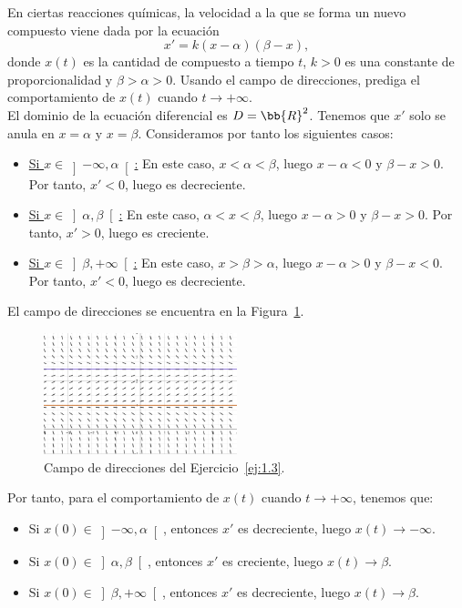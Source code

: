\begin{ejercicio} \label{ej:1.3}
    En ciertas reacciones químicas, la velocidad a la que se forma un nuevo compuesto viene dada por la ecuación
    \begin{equation*}
        x' = k(x - \alpha)(\beta - x),
    \end{equation*}
    donde \(x(t)\) es la cantidad de compuesto a tiempo \(t\), \(k > 0\) es una constante de proporcionalidad y \(\beta > \alpha > 0\). Usando el campo de direcciones, prediga el comportamiento de \(x(t)\) cuando \(t \to +\infty\).\\

    El dominio de la ecuación diferencial es $D=\bb{R}^2$.
    Tenemos que $x'$ solo se anula en $x=\alpha$ y $x=\beta$.
    Consideramos por tanto los siguientes casos:
    \begin{itemize}
        \item \ul{Si $x\in \left]-\infty, \alpha\right[$:} En este caso, $x<\alpha<\beta$, luego $x-\alpha<0$ y $\beta-x>0$. Por tanto, $x'<0$, luego es decreciente.
        \item \ul{Si $x\in \left]\alpha, \beta\right[$:} En este caso, $\alpha<x<\beta$, luego $x-\alpha>0$ y $\beta-x>0$. Por tanto, $x'>0$,
        luego es creciente.
        \item \ul{Si $x\in \left]\beta, +\infty\right[$:} En este caso, $x>\beta>\alpha$, luego $x-\alpha>0$ y $\beta-x<0$. Por tanto, $x'<0$,
        luego es decreciente.
    \end{itemize}

    El campo de direcciones se encuentra en la Figura~\ref{fig:ej1.3}.
    \begin{figure}[H]
        \centering
        \includegraphics[width=0.5\textwidth]{Imagenes/Rel1_Ej3.png}
        \caption{Campo de direcciones del Ejercicio~\ref{ej:1.3}.}
        \label{fig:ej1.3}
    \end{figure}

    Por tanto, para el comportamiento de $x(t)$ cuando $t\to +\infty$, tenemos que:
    \begin{itemize}
        \item Si $x(0)\in \left]-\infty, \alpha\right[$, entonces $x'$ es decreciente, luego $x(t)\to -\infty$.
        \item Si $x(0)\in \left]\alpha, \beta\right[$, entonces $x'$ es creciente, luego $x(t)\to \beta$.
        \item Si $x(0)\in \left]\beta, +\infty\right[$, entonces $x'$ es decreciente, luego $x(t)\to \beta$.
    \end{itemize}
\end{ejercicio}


